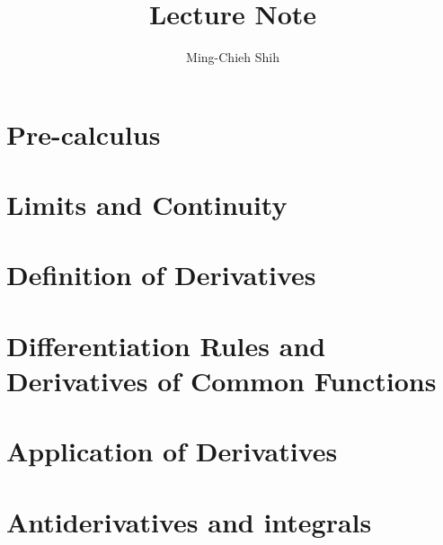 \documentclass{easyclass}
\begin{document}
\begin{titlepage}
    \title{Lecture Note}
    \author{Ming-Chieh Shih}
    \maketitle
\end{titlepage}

\tableofcontents

\chapter{Pre-calculus}


\chapter{Limits and Continuity}


\chapter{Definition of Derivatives}


\chapter{Differentiation Rules and Derivatives of Common Functions}


\chapter{Application of Derivatives}


\chapter{Antiderivatives and integrals}


%
\end{document}
